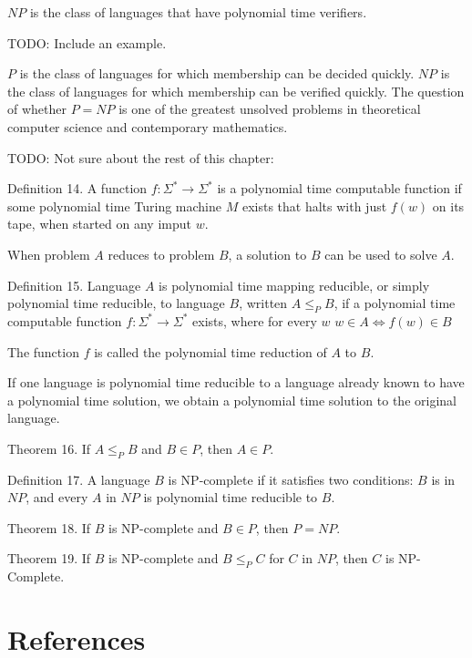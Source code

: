 {\color{red}
\begin{definition}
$NP$ is the class of languages that have polynomial time verifiers.
\end{definition}
}


{\color{red} TODO: Include an example.}

{\color{red} $P$ is the class of languages for which membership can be decided quickly. $NP$ is the class of languages for which membership can be verified quickly. The question of whether $P=NP$ is one of the greatest unsolved problems in theoretical computer science and contemporary mathematics.}


{\color{red} TODO: Not sure about the rest of this chapter:

Definition 14. A function $f:\Sigma^{\ast}\rightarrow\Sigma^{\ast}$ is a polynomial time computable function if some polynomial time Turing machine $M$ exists that halts with just $f(w)$ on its tape, when started on any imput $w$.

When problem $A$ reduces to problem $B$, a solution to $B$ can be used to solve $A$.

Definition 15. Language $A$ is polynomial time mapping reducible, or simply polynomial time reducible, to language $B$, written $A\leq_{P}B$, if a polynomial time computable function $f:\Sigma^{\ast}\rightarrow\Sigma^{\ast}$ exists, where for every $w$ $w\in A\iff f(w)\in B$

The function $f$ is called the polynomial time reduction of $A$ to $B$.

If one language is polynomial time reducible to a language already known to have a polynomial time solution, we obtain a polynomial time solution to the original language.

Theorem 16. If $A\leq_{P}B$ and $B\in P$, then $A\in P$.

Definition 17. A language $B$ is NP-complete if it satisfies two conditions: $B$ is in $NP$, and every $A$ in $NP$ is polynomial time reducible to $B$.

Theorem 18. If $B$ is NP-complete and $B\in P$, then $P=NP$.

Theorem 19. If $B$ is NP-complete and $B\leq_{P}C$ for $C$ in $NP$, then $C$ is NP-Complete.

}

%
%

\section*{References}

